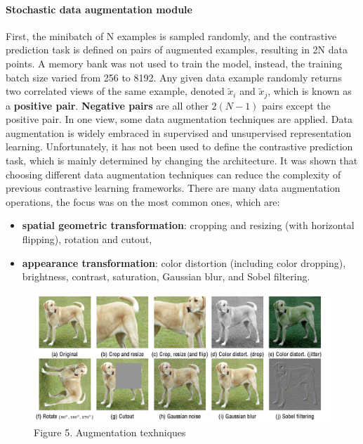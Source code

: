 \documentclass[
]{krantz}
\providecommand{\tightlist}{%
  \setlength{\itemsep}{0pt}\setlength{\parskip}{0pt}}
\begin{document}
\hypertarget{stochastic-data-augmentation-module}{%
\paragraph{Stochastic data augmentation module}\label{stochastic-data-augmentation-module}}

First, the minibatch of N examples is sampled randomly, and the contrastive prediction task is defined on pairs of augmented examples, resulting in 2N data points. A memory bank was not used to train the model, instead, the training batch size varied from 256 to 8192.
Any given data example randomly returns two correlated views of the same example, denoted \(\tilde{x}_{i}\) and \(\tilde{x}_{j}\), which is known as a \textbf{positive pair}. \textbf{Negative pairs} are all other \(2(N-1)\) pairs except the positive pair. In one view, some data augmentation techniques are applied.
Data augmentation is widely embraced in supervised and unsupervised representation learning. Unfortunately, it has not been used to define the contrastive prediction task, which is mainly determined by changing the architecture. It was shown that choosing different data augmentation techniques can reduce the complexity of previous contrastive learning frameworks.
There are many data augmentation operations, the focus was on the most common ones, which are:

\begin{itemize}
\tightlist
\item
  \textbf{spatial geometric transformation}: cropping and resizing (with horizontal flipping), rotation and cutout,
\item
  \textbf{appearance transformation}: color distortion (including color dropping), brightness, contrast, saturation, Gaussian blur, and Sobel filtering.
\end{itemize}

\begin{figure}

{\centering \includegraphics[width=0.8\linewidth]{./figures/01-chapter1/augmentation} 

}

\caption{Figure 5. Augmentation texhniques}\label{fig:ch01-figure05}
\end{figure}
\end{document}
